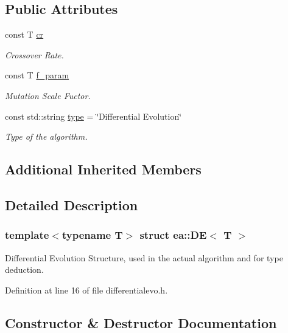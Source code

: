 \subsection*{Public Attributes}
\begin{DoxyCompactItemize}
\item 
const T \hyperlink{structea_1_1_d_e_adc00ae4bfe7fb6c2581e08ca47e753b2}{cr}
\begin{DoxyCompactList}\small\item\em Crossover Rate. \end{DoxyCompactList}\item 
const T \hyperlink{structea_1_1_d_e_a6b798f4a095796b766b2452aacea8a6b}{f\+\_\+param}
\begin{DoxyCompactList}\small\item\em Mutation Scale Fuctor. \end{DoxyCompactList}\item 
const std\+::string \hyperlink{structea_1_1_d_e_a0968311419d1919244af4415b294739a}{type} = \char`\"{}Differential Evolution\char`\"{}
\begin{DoxyCompactList}\small\item\em Type of the algorithm. \end{DoxyCompactList}\end{DoxyCompactItemize}
\subsection*{Additional Inherited Members}


\subsection{Detailed Description}
\subsubsection*{template$<$typename T$>$\newline
struct ea\+::\+D\+E$<$ T $>$}

Differential Evolution Structure, used in the actual algorithm and for type deduction. 

Definition at line 16 of file differentialevo.\+h.



\subsection{Constructor \& Destructor Documentation}
\mbox{\label{structea_1_1_d_e_a407d0c61464c79e200906e95370f70c4}} 
